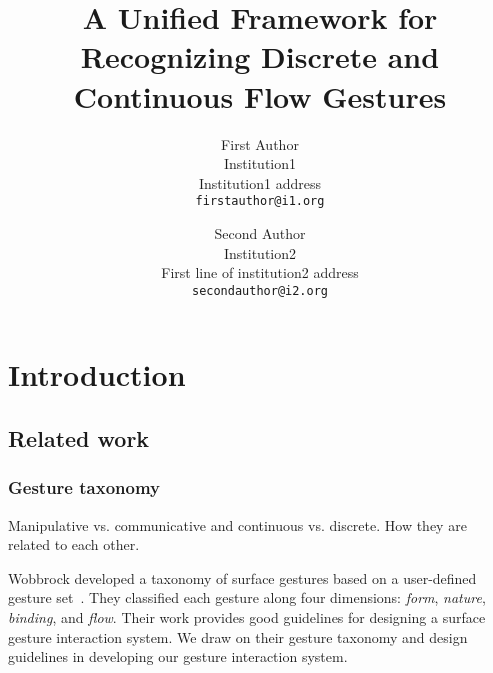 \documentclass[10pt,twocolumn,letterpaper]{article}
\begin{document}
\title{A Unified Framework for Recognizing Discrete and Continuous Flow Gestures}

\author{First Author\\
Institution1\\
Institution1 address\\
{\tt\small firstauthor@i1.org}
\and
Second Author\\
Institution2\\
First line of institution2 address\\
{\tt\small secondauthor@i2.org}
}

\maketitle

\begin{abstract}
 
\end{abstract}

\section{Introduction}

\subsection{Related work}
\subsubsection{Gesture taxonomy}
Manipulative vs. communicative and continuous vs. discrete. How they are related
to each other. 

Wobbrock \etal developed a taxonomy of surface gestures based on a user-defined
gesture set~\cite{Wobbrock09}. They classified each gesture along four dimensions: 
\textit{form}, \textit{nature}, \textit{binding}, and \textit{flow}. Their work 
provides good guidelines for designing a surface gesture interaction system. 
We draw on their gesture taxonomy and design guidelines in developing our gesture 
interaction system. 
\end{document}
